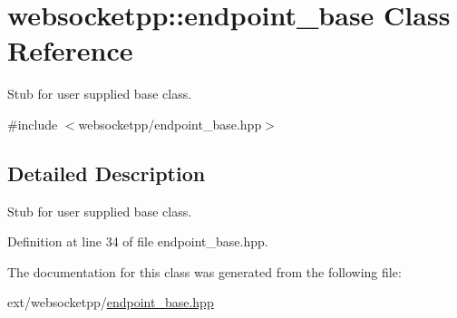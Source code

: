 \hypertarget{classwebsocketpp_1_1endpoint__base}{}\section{websocketpp\+:\+:endpoint\+\_\+base Class Reference}
\label{classwebsocketpp_1_1endpoint__base}


Stub for user supplied base class.  




{\ttfamily \#include $<$websocketpp/endpoint\+\_\+base.\+hpp$>$}



\subsection{Detailed Description}
Stub for user supplied base class. 

Definition at line 34 of file endpoint\+\_\+base.\+hpp.



The documentation for this class was generated from the following file\+:\begin{DoxyCompactItemize}
\item 
ext/websocketpp/\hyperlink{endpoint__base_8hpp}{endpoint\+\_\+base.\+hpp}\end{DoxyCompactItemize}
